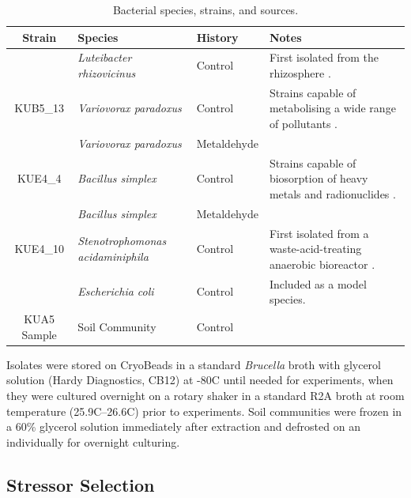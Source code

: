 \documentclass[final,1p,times]{elsarticle}
\begin{document}
\begin{table}[ht]
\begin{small}
\centering
\begin{tabular}{c p{3.1cm} l p{5.2cm}}
\toprule 
\textbf{{Strain}} & \textbf{{Species}} & \textbf{{History}} & \textbf{{Notes}} \\
\midrule
\rowcolor{gggrey}{LUF4\_5} & \textit{Luteibacter rhizovicinus} & Control & First isolated from the rhizosphere \cite{Johansen2005LuteibacterL.}. \\
{KUB5\_13} & \textit{Variovorax paradoxus} & Control & Strains capable of metabolising a wide range of pollutants \cite{Satola2013MetabolicParadoxus}. \\
\rowcolor{gggrey}{NUF1\_3} & \textit{Variovorax paradoxus} & Metaldehyde & \\
{KUE4\_4} & \textit{Bacillus simplex} & Control & Strains capable of biosorption of heavy metals and radionuclides \cite{Valentine1996BiosorptionZone}. \\
\rowcolor{gggrey}{NUE1\_1} & \textit{Bacillus simplex} & Metaldehyde & \\
{KUE4\_10} & \textit{Stenotrophomonas \newline acidaminiphila} & Control & First isolated from a waste-acid-treating anaerobic bioreactor \cite{Assih2002}. \\
\rowcolor{gggrey}{OP50} & \textit{Escherichia coli} & Control & Included as a model species. \\
{KUA5 Sample} & Soil Community & Control & \\
\bottomrule
\end{tabular}
\caption{Bacterial species, strains, and sources.}
\label{tab:isolates}
\end{small}
\end{table}

Isolates were stored on CryoBeads in a standard \textit{Brucella} broth with glycerol solution (Hardy Diagnostics, CB12) at -80\textdegree C until needed for experiments, when they were cultured overnight on a rotary shaker in a standard R2A broth at room temperature (25.9\textdegree C–26.6\textdegree C) prior to experiments. Soil communities were frozen in a 60\% glycerol solution immediately after extraction and defrosted on an individually for overnight culturing. 

\subsection{Stressor Selection}
\label{S:2:2}
\end{document}
